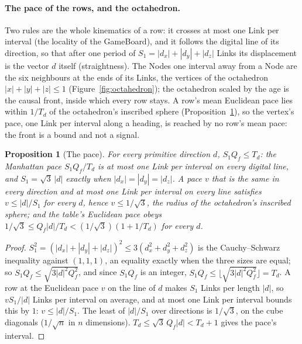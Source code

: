 \documentclass[11pt]{article}
\newtheorem{proposition}{Proposition}
\theoremstyle{definition}
\begin{document}
\paragraph{The pace of the rows, and the octahedron.} Two rules are the
whole kinematics of a row: it crosses at most one Link per interval (the
locality of the GameBoard), and it follows the digital line of its
direction, so that after one period of $S_1 = |d_x| + |d_y| + |d_z|$
Links its displacement is the vector $d$ itself (straightness). The Nodes
one interval away from a Node are the six neighbours at the ends of its
Links, the vertices of the octahedron $|x| + |y| + |z| \le 1$
(Figure~\ref{fig:octahedron}); the octahedron scaled by the age is the
causal front, inside which every row stays. A row's mean Euclidean pace
lies within $1/T_d$ of the octahedron's inscribed sphere
(Proposition~\ref{prop:pace}), so the vertex's pace, one Link per
interval along a heading, is reached by no row's mean pace: the front is
a bound and not a signal.

\begin{proposition}[The pace]\label{prop:pace}
For every primitive direction $d$, $S_1 Q_f \le T_d$: the Manhattan pace
$S_1 Q_f/T_d$ is at most one Link per interval on every digital line, and
$S_1 = \sqrt3\,|d|$ exactly when $|d_x| = |d_y| = |d_z|$. A pace $v$ that
is the same in every direction and at most one Link per interval on every
line satisfies $v \le |d|/S_1$ for every $d$, hence $v \le 1/\sqrt3$, the
radius of the octahedron's inscribed sphere; and the table's Euclidean
pace obeys $1/\sqrt3 \le Q_f|d|/T_d < (1/\sqrt3)(1 + 1/T_d)$ for every $d$.
\end{proposition}
\begin{proof}
$S_1^2 = (|d_x| + |d_y| + |d_z|)^2 \le 3(d_x^2 + d_y^2 + d_z^2)$ is the
Cauchy--Schwarz inequality against $(1, 1, 1)$, an equality exactly when
the three sizes are equal; so $S_1 Q_f \le \sqrt{3|d|^2Q_f^2}$, and since
$S_1 Q_f$ is an integer, $S_1 Q_f \le \lfloor\sqrt{3|d|^2Q_f^2}\rfloor =
T_d$. A row at the Euclidean pace $v$ on the line of $d$ makes $S_1$
Links per length $|d|$, so $vS_1/|d|$ Links per interval on average, and
at most one Link per interval bounds this by $1$: $v \le |d|/S_1$. The
least of $|d|/S_1$ over directions is $1/\sqrt3$, on the cube diagonals
($1/\sqrt n$ in $n$ dimensions). $T_d \le \sqrt3\,Q_f|d| < T_d + 1$ gives
the pace's interval.
\end{proof}
\end{document}
